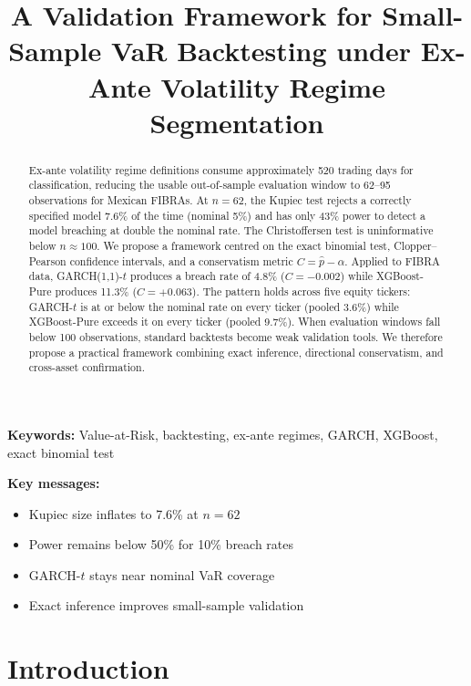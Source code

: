 \documentclass[12pt,a4paper]{article}
\begin{document}
\begin{abstract}
Ex-ante volatility regime definitions consume approximately 520 trading days for classification, reducing the usable out-of-sample evaluation window to 62--95 observations for Mexican FIBRAs. At $n = 62$, the Kupiec test rejects a correctly specified model 7.6\% of the time (nominal 5\%) and has only 43\% power to detect a model breaching at double the nominal rate. The Christoffersen test is uninformative below $n \approx 100$. We propose a framework centred on the exact binomial test, Clopper--Pearson confidence intervals, and a conservatism metric $C = \hat{p} - \alpha$. Applied to FIBRA data, GARCH(1,1)-$t$ produces a breach rate of 4.8\% ($C = -0.002$) while XGBoost-Pure produces 11.3\% ($C = +0.063$). The pattern holds across five equity tickers: GARCH-$t$ is at or below the nominal rate on every ticker (pooled 3.6\%) while XGBoost-Pure exceeds it on every ticker (pooled 9.7\%). When evaluation windows fall below 100 observations, standard backtests become weak validation tools. We therefore propose a practical framework combining exact inference, directional conservatism, and cross-asset confirmation.
\end{abstract}

\bigskip
\noindent\textbf{Keywords:} Value-at-Risk, backtesting, ex-ante regimes, GARCH, XGBoost, exact binomial test

\medskip
\noindent\textbf{Key messages:}
\begin{itemize}
  \item Kupiec size inflates to 7.6\% at $n = 62$
  \item Power remains below 50\% for 10\% breach rates
  \item GARCH-$t$ stays near nominal VaR coverage
  \item Exact inference improves small-sample validation
\end{itemize}

\title{A Validation Framework for Small-Sample VaR Backtesting under Ex-Ante Volatility Regime Segmentation}
\maketitle

\section{Introduction}
\end{document}

